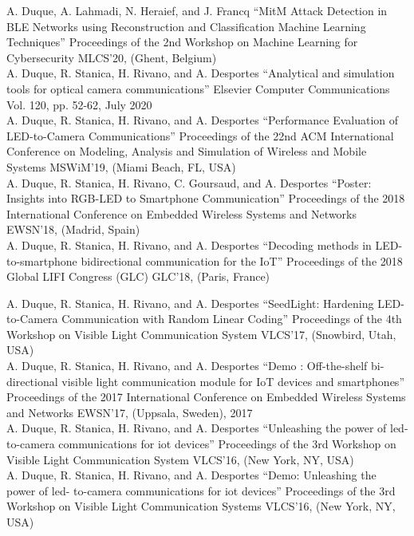 \documentclass[]{cv-style}          %
\begin{document}
\normalsize
\begin{publist}
\pub
{A. Duque, A. Lahmadi, N. Heraief, and J. Francq}
{“MitM Attack Detection in BLE Networks using Reconstruction and Classification Machine Learning Techniques”}
{Proceedings of the 2nd Workshop on Machine Learning for Cybersecurity}
{MLCS’20, (Ghent, Belgium)}\\
\pub
{A. Duque, R. Stanica, H. Rivano, and A. Desportes}
{“Analytical and simulation tools for optical camera communications”}
{Elsevier Computer Communications}
{Vol. 120, pp. 52-62, July 2020}\\
\pub
{A. Duque, R. Stanica, H. Rivano, and A. Desportes}
{“Performance Evaluation of LED-to-Camera Communications”}
{Proceedings of the 22nd ACM International Conference on Modeling, Analysis and Simulation of Wireless and Mobile Systems}
{MSWiM’19, (Miami Beach, FL, USA)}\\
\pub
{A. Duque, R. Stanica, H. Rivano, C. Goursaud, and A. Desportes}
{“Poster: Insights into RGB-LED to Smartphone Communication”}
{Proceedings of the 2018 International Conference on Embedded Wireless Systems and Networks}
{EWSN’18, (Madrid, Spain)}\\
\pub
{A. Duque, R. Stanica, H. Rivano, and A. Desportes}
{“Decoding methods in LED-to-smartphone bidirectional communication for the IoT”}
{Proceedings of the 2018 Global LIFI Congress (GLC)}
{GLC’18, (Paris, France)}\\
\end{publist}
\begin{publist}
\pub
{A. Duque, R. Stanica, H. Rivano, and A. Desportes}
{“SeedLight: Hardening LED-to-Camera Communication with Random Linear Coding”}
{Proceedings of the 4th Workshop on Visible Light Communication System}
{VLCS’17, (Snowbird, Utah, USA)}\\

\pub
{A. Duque, R. Stanica, H. Rivano, and A. Desportes}
{“Demo : Off-the-shelf bi-directional visible light communication module for IoT devices and smartphones”}
{Proceedings of the 2017 International Conference on Embedded Wireless Systems and Networks}
{EWSN’17, (Uppsala, Sweden), 2017}\\
\pub
  {A. Duque, R. Stanica, H. Rivano, and A. Desportes}
  {“Unleashing the power of led- to-camera communications for iot devices”}
  {Proceedings of the 3rd Workshop on Visible Light Communication System}
  {VLCS’16, (New York, NY, USA)}\\
\pub
  {A. Duque, R. Stanica, H. Rivano, and A. Desportes} {“Demo: Unleashing the power of led- to-camera communications for iot devices”} {Proceedings of the 3rd Workshop on Visible Light Communication Systems} {VLCS’16, (New York, NY, USA)}
\end{publist}
\end{document}
